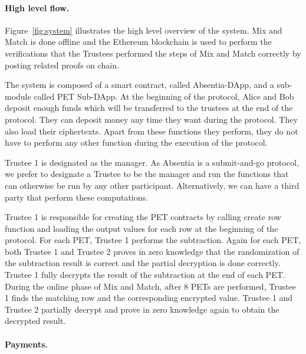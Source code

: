 
\paragraph{High level flow.} 
Figure~\ref{fig:system} illustrates the high level overview of the system. Mix and Match is done offline and the Ethereum blockchain is used to perform the verifications that the Trustees performed the steps of Mix and Match correctly by posting related proofs on chain.


The system is composed of a smart contract, called Absentia-DApp, and a sub-module called PET Sub-DApp. At the beginning of the protocol, Alice and Bob deposit enough funds which will be transferred to the trustees at the end of the protocol. They can deposit money any time they want during the protocol. They also load their ciphertexts. Apart from these functions they perform, they do not have to perform any other function during the execution of the protocol.

Trustee 1 is designated as the manager. As Absentia is a submit-and-go  protocol, we prefer to designate a Trustee to be the manager and run the functions that can otherwise be run by any other participant. Alternatively, we can have a third party that perform these computations. 

Trustee 1 is responsible for creating the PET contracts by calling create row function and loading the output values for each row at the beginning of the protocol. For each PET, Trustee 1 performs the subtraction. Again for each PET, both Trustee 1 and Trustee 2 proves in zero knowledge that the randomization of the subtraction result is correct and the partial decryption is done correctly. Trustee 1 fully decrypts the result of the subtraction at the end of each PET. During the online phase of Mix and Match, after 8 PETs are performed, Trustee 1 finds the matching row and the corresponding encrypted value. Trustee 1 and Trustee 2 partially decrypt and prove in zero knowledge again to obtain the decrypted result.


\paragraph{Payments.}

